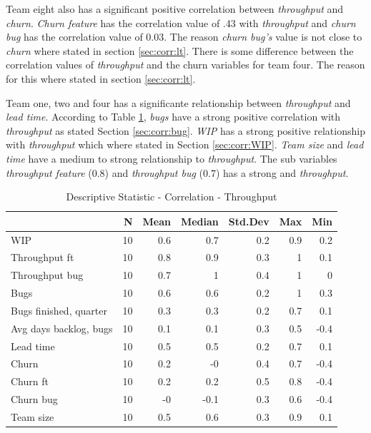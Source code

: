 \documentclass[UKenglish]{ifimaster}  %
\begin{document}
\newpage

 
Team eight also has a significant positive correlation between \textit{throughput} and \textit{churn}. \textit{Churn feature} has the correlation value of .43 with \textit{throughput} and \textit{churn bug} has the correlation value of 0.03. The reason \textit{churn bug's} value is not close to \textit{churn} where stated in section \ref{sec:corr:lt}. There is some difference between the correlation values of \textit{throughput} and the churn variables for team four. The reason for this where stated in section \ref{sec:corr:lt}. 

Team one, two and four has a significante relationship between \textit{throughput} and \textit{lead time}. According to Table \ref{DS:corr:TP}, \textit{bugs} have a strong positive correlation with \textit{throughput} as stated Section \ref{sec:corr:bug}. \textit{WIP} has a strong positive relationship with \textit{throughput} which where stated in Section \ref{sec:corr:WIP}. \textit{Team size} and \textit{lead time} have a medium to strong relationship to \textit{throughput}. The sub variables \textit{throughput feature} (0.8) and \textit{throughput bug} (0.7) has  a strong and \textit{throughput}. 

\begin{table}[!htbp]
 \centering
 \begin{tabular}{ | l | r | r | r | r | r | r | }
 \hline
& \bf{N} & \bf{Mean} & \bf{Median} & \bf{Std.Dev} & \bf{Max} & \bf{Min} \\ \hline
WIP  & 10 & 0.6 & 0.7 & 0.2 & 0.9 & 0.2\\ \hline
Throughput ft  & 10 & 0.8 & 0.9 & 0.3 & 1 & 0.1\\ \hline
Throughput bug  & 10 & 0.7 & 1 & 0.4 & 1 & 0\\ \hline
Bugs  & 10 & 0.6 & 0.6 & 0.2 & 1 & 0.3\\ \hline
Bugs finished, quarter  & 10 & 0.3 & 0.3 & 0.2 & 0.7 & 0.1\\ \hline
Avg days backlog, bugs  & 10 & 0.1 & 0.1 & 0.3 & 0.5 & -0.4\\ \hline
Lead time & 10 & 0.5 & 0.5 & 0.2 & 0.7 & 0.1\\ \hline
Churn  & 10 & 0.2 & -0 & 0.4 & 0.7 & -0.4\\ \hline
Churn ft  & 10 & 0.2 & 0.2 & 0.5 & 0.8 & -0.4\\ \hline
Churn bug  & 10 & -0 & -0.1 & 0.3 & 0.6 & -0.4\\ \hline
Team size  & 10 & 0.5 & 0.6 & 0.3 & 0.9 & 0.1\\ \hline
\end{tabular}
 \caption{Descriptive Statistic - Correlation - Throughput}
 \label{DS:corr:TP}
 \end{table}
\end{document}
